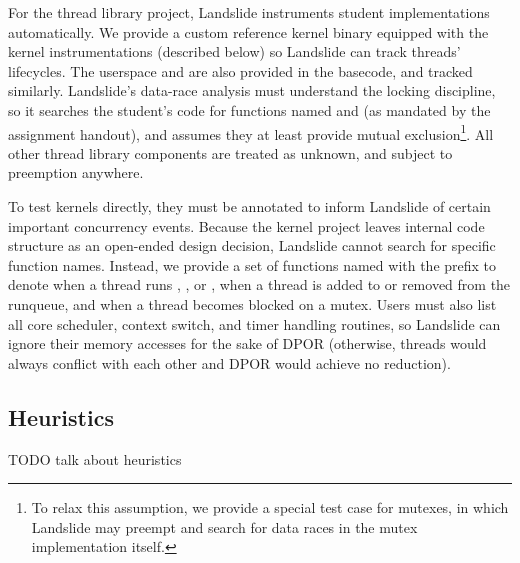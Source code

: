 For the thread library project, Landslide instruments student implementations automatically.
We provide a custom reference kernel binary equipped with the kernel instrumentations (described below)
so Landslide can track threads' lifecycles. %
The userspace  and  are also provided in the basecode, and tracked similarly.
Landslide's data-race analysis must understand the locking discipline,
so it searches the student's code for functions named  and  (as mandated by the assignment handout),
and assumes they at least provide mutual exclusion\footnote{
	To relax this assumption, we provide a special test case for mutexes,
	in which Landslide may preempt and search for data races in the mutex implementation itself.
}.
All other thread library components are treated as unknown, and subject to preemption anywhere.

To test \pebbles kernels directly, they must be annotated to inform Landslide of certain important concurrency events.
Because the kernel project leaves internal code structure as an open-ended design decision,
Landslide cannot search for specific function names. %
Instead, we provide a set of functions named with the prefix 
to denote when a thread runs , , or , when a thread is added to or removed from the runqueue, and when a thread becomes blocked on a mutex.
Users must also list all core scheduler, context switch, and timer handling routines, so Landslide can ignore their memory accesses for the sake of DPOR
(otherwise, threads would always conflict with each other and DPOR would achieve no reduction).

\subsection{Heuristics}

TODO talk about heuristics
